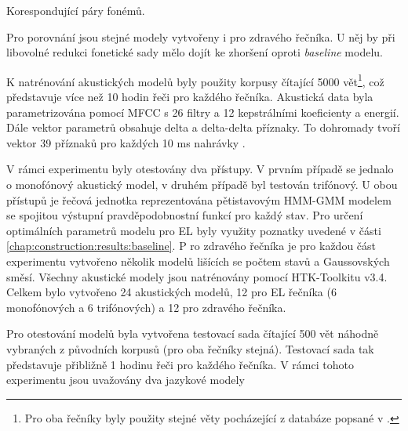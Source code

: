 \begin{table}[htpb]
  \centering
  \def\arraystretch{1.5}
  \caption{Korespondující páry fonémů.}
  \label{tab:construction:reduction:pairs}
\end{table}

\noindent Pro porovnání jsou stejné modely vytvořeny i pro zdravého řečníka.
U něj by při libovolné redukci fonetické sady mělo dojít ke zhoršení oproti \textit{baseline} modelu.

K natrénování akustických modelů byly použity korpusy čítající 5000 vět\footnote{Pro oba řečníky byly použity stejné věty pocházející z databáze popsané v \cite{Radova2000}.}, což představuje více než 10 hodin řeči pro každého řečníka.
Akustická data byla parametrizována pomocí MFCC s 26 filtry a 12 kepstrálními koeficienty a energií.
Dále vektor parametrů obsahuje delta a delta-delta příznaky.
To dohromady tvoří vektor 39 příznaků pro každých 10 ms nahrávky \cite{Psutka2007}.

V rámci experimentu byly otestovány dva přístupy.
V prvním případě se jednalo o monofónový akustický model, v druhém případě byl testován trifónový.
U obou přístupů je řečová jednotka reprezentována pětistavovým HMM-GMM modelem se spojitou výstupní pravděpodobnostní funkcí pro každý stav.
Pro určení optimálních parametrů modelu pro EL byly využity poznatky uvedené v  části \ref{chap:construction:results:baseline}. P
ro zdravého řečníka je pro každou část experimentu vytvořeno několik modelů lišících se počtem stavů a Gaussovských směsí.
Všechny akustické modely jsou natrénovány pomocí HTK-Toolkitu v3.4.
Celkem bylo vytvořeno 24 akustických modelů, 12 pro EL řečníka (6 monofónových a 6 trifónových) a 12 pro zdravého řečníka.

Pro otestování modelů byla vytvořena testovací sada čítající 500 vět náhodně vybraných z původních korpusů (pro oba řečníky stejná).
Testovací sada tak představuje přibližně 1 hodinu řeči pro každého řečníka.
V rámci tohoto experimentu jsou uvažovány dva jazykové modely


